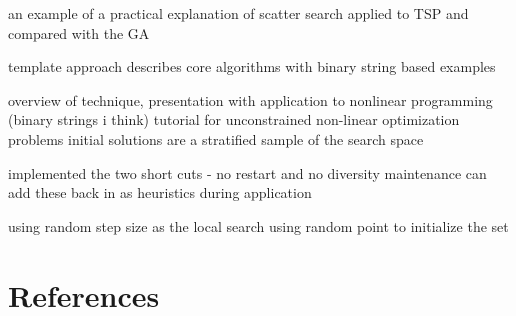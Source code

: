 \documentclass[a4paper, 11pt]{article}
\begin{document}
an example of a practical explanation of scatter search applied to TSP and compared with the GA \cite{Marti2005}

template approach describes core algorithms with binary string based examples \cite{Glover1998a}

overview of technique, presentation with application to nonlinear programming (binary strings i think) \cite{Glover2003b}
tutorial for unconstrained non-linear optimization problems
initial solutions are a stratified sample of the search space



implemented the two short cuts - no restart and no diversity maintenance
can add these back in as heuristics during application

using random step size as the local search
using random point to initialize the set






\section{References}
\label{sec:references}
\end{document}
